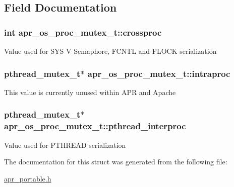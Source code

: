 \subsection{Field Documentation}
\hypertarget{structapr__os__proc__mutex__t_ab75e29a654ba0ff0dc491b625308fb79}{
\subsubsection[{crossproc}]{\setlength{\rightskip}{0pt plus 5cm}int apr\-\_\-os\-\_\-proc\-\_\-mutex\-\_\-t\-::crossproc}}\label{structapr__os__proc__mutex__t_ab75e29a654ba0ff0dc491b625308fb79}
Value used for S\-Y\-S V Semaphore, F\-C\-N\-T\-L and F\-L\-O\-C\-K serialization \hypertarget{structapr__os__proc__mutex__t_aa2e01fa37b652185a0dd3fae80caa4ad}{
\subsubsection[{intraproc}]{\setlength{\rightskip}{0pt plus 5cm}pthread\-\_\-mutex\-\_\-t$\ast$ apr\-\_\-os\-\_\-proc\-\_\-mutex\-\_\-t\-::intraproc}}\label{structapr__os__proc__mutex__t_aa2e01fa37b652185a0dd3fae80caa4ad}
This value is currently unused within A\-P\-R and Apache \hypertarget{structapr__os__proc__mutex__t_aed588bef2efc836e5a768f32638e89c1}{
\subsubsection[{pthread\-\_\-interproc}]{\setlength{\rightskip}{0pt plus 5cm}pthread\-\_\-mutex\-\_\-t$\ast$ apr\-\_\-os\-\_\-proc\-\_\-mutex\-\_\-t\-::pthread\-\_\-interproc}}\label{structapr__os__proc__mutex__t_aed588bef2efc836e5a768f32638e89c1}
Value used for P\-T\-H\-R\-E\-A\-D serialization 

The documentation for this struct was generated from the following file\-:\begin{DoxyCompactItemize}
\item 
\hyperlink{apr__portable_8h}{apr\-\_\-portable.\-h}\end{DoxyCompactItemize}
